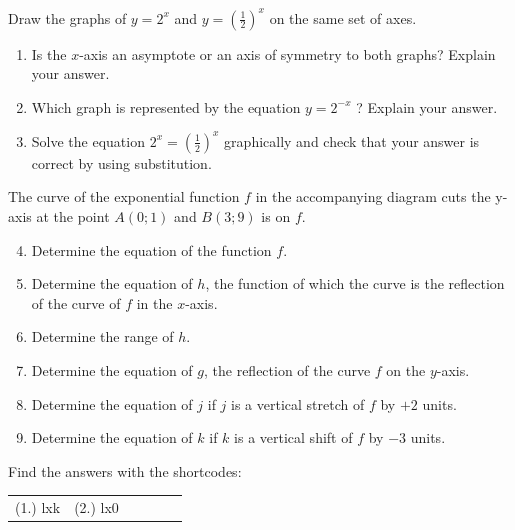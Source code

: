 \begin{exercises}{ }
 {
 
Draw the graphs of $y=2^{x}$ and $y=(\frac{1}{2})^{x}$ on the same set of axes.
\begin{enumerate}[noitemsep, label=\textbf{\arabic*}. ] 
\item Is the $x$-axis an asymptote or an axis of symmetry to both graphs? Explain your answer.
\item Which graph is represented by the equation $y=2^{-x}$ ? Explain your answer.
\item Solve the equation $2^{x}=(\frac{1}{2})^{x}$ graphically and check that your answer is correct by using substitution.
\end{enumerate}
The curve of the exponential function $f$ in the accompanying diagram cuts the y-axis at the point $A(0; 1)$ and $B(3; 9)$ is on $f$.
\begin{enumerate}[noitemsep, label=\textbf{\arabic*}. ] 
\setcounter{enumi}{3}
\item Determine the equation of the function $f$.
\item Determine the equation of $h$, the function of which the curve is the reflection of the curve of $f$ in the $x$-axis.
\item Determine the range of $h$.
\item Determine the equation of $g$, the reflection of the curve $f$ on the $y$-axis.
\item Determine the equation of $j$ if $j$ is a vertical stretch of $f$ by $+2$ units.
\item Determine the equation of $k$ if $k$ is a vertical shift of $f$ by $-3$ units.
\end{enumerate}


\par {} Find the answers with the shortcodes:
\par \begin{tabular}[h]{cccccc}
(1.) lxk  &  (2.) lx0  & \end{tabular}
}
\end{exercises}

